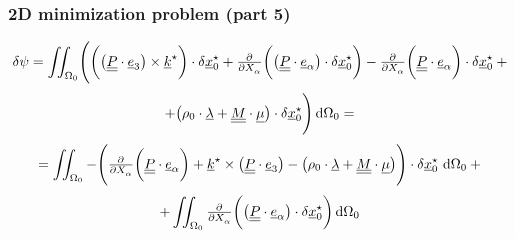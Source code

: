 \begin{frame}
\end{frame}


\begin{frame}
  \frametitle{2D minimization problem (part 5)}
  \vspace{-1em}
  \begin{displaymath}
    \delta \psi = 
    \iint_{\Omega_0} \Biggl(
      \biggl( \bigl( \doubleunderline{P} \cdot \underline{e}_3 \bigr) \times \underline{k}^{\star} \biggr) \cdot \delta \underline{x}_0^{\star} +
      \pd{}{X_{\alpha}} \biggl( \bigl( \doubleunderline{P} \cdot \underline{e}_{\alpha} \bigr) \cdot \delta \underline{x}_0^{\star} \biggr) -
      \pd{}{X_{\alpha}} \biggl( \doubleunderline{P} \cdot \underline{e}_{\alpha} \biggr) \cdot \delta \underline{x}_0^{\star} \: +
  \end{displaymath}
  \begin{displaymath}
      + \bigl(
        \rho_0 \cdot \underline{\lambda} +
        \doubleunderline{M} \cdot \underline{\mu}
      \bigr) \cdot \delta \underline{x}_0^{\star}
    \Biggr) \dif \Omega_0 =
  \end{displaymath}
  \begin{displaymath}
    = \iint_{\Omega_0} - \Biggl(
      \pd{}{X_{\alpha}} \biggl( \doubleunderline{P} \cdot \underline{e}_{\alpha} \biggr) +
      \underline{k}^{\star} \times \bigl( \doubleunderline{P} \cdot \underline{e}_3 \bigr) -
      \bigl(
        \rho_0 \cdot \underline{\lambda} +
        \doubleunderline{M} \cdot \underline{\mu}
      \bigr)
    \Biggr) \cdot \delta \underline{x}_0^{\star} \, \dif \Omega_0 \: +
  \end{displaymath}
  \begin{displaymath}
    + \iint_{\Omega_0}
      \pd{}{X_{\alpha}} \biggl( \bigl( \doubleunderline{P} \cdot \underline{e}_{\alpha} \bigr) \cdot \delta \underline{x}_0^{\star} \biggr)
    \dif \Omega_0
  \end{displaymath}
  
  
\end{frame}


